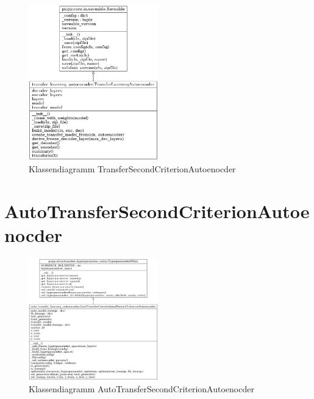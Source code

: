 	
	\begin{figure}[h]
		\centering
		\includegraphics[width=0.5\textwidth, center]{bilder/Klassendiagramme/Klassendiagramm_TLCSCAE.png}
		\caption[Klassendiagramm TransferSecondCriterionAutoenocder]{Klassendiagramm TransferSecondCriterionAutoenocder}
		\label{img:KlassendiagrammTransferSecondCriterionAutoenocder}
	\end{figure}  
			
	\section{AutoTransferSecondCriterionAutoenocder}
	\label{sec:AutoTransferSecondCriterionAutoenocder}


	\begin{figure}[h]
		\centering
		\includegraphics[width=0.5\textwidth, center]{bilder/Klassendiagramme/Klassendiagramm_AutoTLCSCAE.png}
		\caption[Klassendiagramm AutoTransferSecondCriterionAutoenocder]{Klassendiagramm AutoTransferSecondCriterionAutoenocder}
		\label{img:KlassendiagrammAutoTransferSecondCriterionAutoenocder}
	\end{figure}  